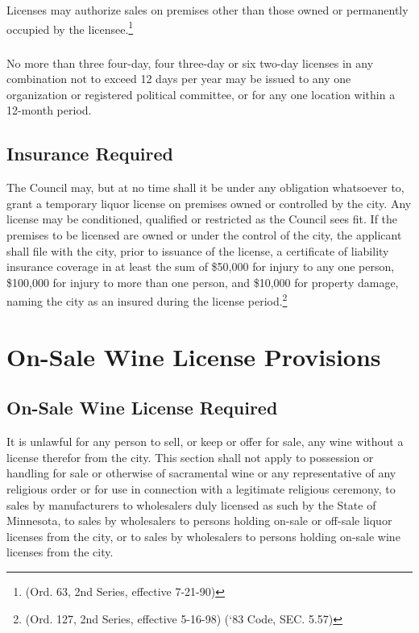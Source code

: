 \subsubsection{}
Licenses may authorize sales on premises other than those owned or permanently occupied by the licensee.\footnote{(Ord. 63, 2nd Series, effective 7-21-90)}
\subsubsection{}
No more than three four-day, four three-day or six two-day licenses in any combination not to exceed 12 days per year may be issued to any one organization or registered political committee, or for any one location within a 12-month period.
\subsection{Insurance Required}
The Council may, but at no time shall it be under any obligation whatsoever to, grant a temporary liquor license on premises owned or controlled by the city.  Any license may be conditioned, qualified or restricted as the Council sees fit.  If the premises to be licensed are owned or under the control of the city, the applicant shall file with the city, prior to issuance of the license, a certificate of liability insurance coverage in at least the sum of \$50,000 for injury to any one person, \$100,000 for injury to more than one person, and \$10,000 for property damage, naming the city as an insured during the license period.\footnote{(Ord. 127, 2nd Series, effective 5-16-98) (‘83 Code, SEC. 5.57)}\\


\setcounter{section}{99}
\section{On-Sale Wine License Provisions}
\subsection{On-Sale Wine License Required}
It is unlawful for any person to sell, or keep or offer for sale, any wine without a license therefor from the city. This section shall not apply to possession or handling for sale or otherwise of sacramental wine or any representative of any religious order or for use in connection with a legitimate religious ceremony, to sales by manufacturers to wholesalers duly licensed as such by the State of Minnesota, to sales by wholesalers to persons holding on-sale or off-sale liquor licenses from the city, or to sales by wholesalers to persons holding on-sale wine licenses from the city.
